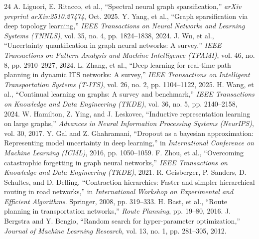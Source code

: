 \documentclass[journal]{IEEEtran}
\begin{document}
\begin{thebibliography}{24}
A. Liguori, E. Ritacco, et al., ``Spectral neural graph sparsification,'' \textit{arXiv preprint arXiv:2510.27474}, Oct. 2025.
Y. Yang, et al., ``Graph sparsification via deep topology learning,'' \textit{IEEE Transactions on Neural Networks and Learning Systems (TNNLS)}, vol. 35, no. 4, pp. 1824--1838, 2024.
J. Wu, et al., ``Uncertainty quantification in graph neural networks: A survey,'' \textit{IEEE Transactions on Pattern Analysis and Machine Intelligence (TPAMI)}, vol. 46, no. 8, pp. 2910--2927, 2024.
L. Zhang, et al., ``Deep learning for real-time path planning in dynamic ITS networks: A survey,'' \textit{IEEE Transactions on Intelligent Transportation Systems (T-ITS)}, vol. 26, no. 2, pp. 1104--1122, 2025.
H. Wang, et al., ``Continual learning on graphs: A survey and benchmark,'' \textit{IEEE Transactions on Knowledge and Data Engineering (TKDE)}, vol. 36, no. 5, pp. 2140--2158, 2024.
W. Hamilton, Z. Ying, and J. Leskovec, ``Inductive representation learning on large graphs,'' \textit{Advances in Neural Information Processing Systems (NeurIPS)}, vol. 30, 2017.
Y. Gal and Z. Ghahramani, ``Dropout as a bayesian approximation: Representing model uncertainty in deep learning,'' in \textit{International Conference on Machine Learning (ICML)}, 2016, pp. 1050--1059.
F. Zhou, et al., ``Overcoming catastrophic forgetting in graph neural networks,'' \textit{IEEE Transactions on Knowledge and Data Engineering (TKDE)}, 2021.
R. Geisberger, P. Sanders, D. Schultes, and D. Delling, ``Contraction hierarchies: Faster and simpler hierarchical routing in road networks,'' in \textit{International Workshop on Experimental and Efficient Algorithms}. Springer, 2008, pp. 319--333.
H. Bast, et al., ``Route planning in transportation networks,'' \textit{Route Planning}, pp. 19--80, 2016.
J. Bergstra and Y. Bengio, ``Random search for hyper-parameter optimization,''
\textit{Journal of Machine Learning Research}, vol. 13, no. 1, pp. 281--305, 2012.
\end{thebibliography}
\end{document}
